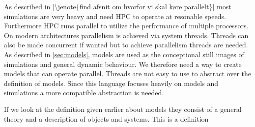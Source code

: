 As described in \cref{\jenote{find afsnit om hvorfor vi skal køre parallelt}} most simulations are very heavy and need HPC to operate at resonable speeds. Furthermore HPC runs parallel to utilize the performance of multiple processors. On modern architectures parallelism is achieved via system threads. Threads can also be made concurrent if wanted but to achieve parallelism threads are needed. As described in \cref{sec:models}, models are used as the conceptional still images of simulations and general dynamic behaviour.  We therefore need a way to create models that can operate parallel. Threads are not easy to use to abstract over the definition of models. Since this language focuses heavily on models and simulations a more compatible abstraction is needed.

If we look at the definition given earlier about models they consist of a general theory and a description of objects and systems. This is a definition 